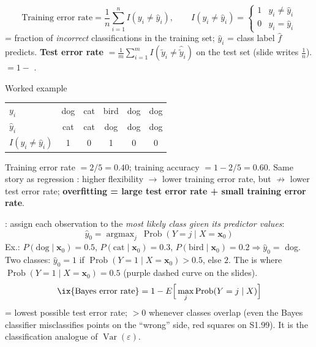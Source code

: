 \begin{keybox}
\[ \text{Training error rate}=\frac1n\sum_{i=1}^n I(y_i\neq\hat y_i),\qquad I(y_i\neq\hat y_i)=\begin{cases}1 & y_i\neq\hat y_i\\0 & y_i=\hat y_i\end{cases} \]
= fraction of \emph{incorrect} classifications in the training set; $\hat y_i$ = class label $\hat f$ predicts. \textbf{Test error rate} $=\frac1m\sum_{i=1}^m I(\tilde y_i\neq\hat{\tilde y}_i)$ on the test set (slide writes $\frac1n$).  $=1-$ .
\end{keybox}

\begin{topic}{Worked example }
\begin{tabular}{@{}lccccc@{}}
$y_i$ & dog & cat & bird & dog & dog\\
$\hat y_i$ & cat & cat & dog & dog & dog\\
$I(y_i\neq\hat y_i)$ & 1 & 0 & 1 & 0 & 0
\end{tabular}

Training error rate $=2/5=0.40$; training accuracy $=1-2/5=0.60$. Same story as regression : higher flexibility $\to$ lower training error rate, but $\not\to$ lower test error rate; \textbf{overfitting = large test error rate + small training error rate}.
\end{topic}

\begin{keybox}
\textbf{}: assign each observation to the \emph{most likely class given its predictor values}:
\[ \hat y_0=\operatorname{argmax}_j\ \operatorname{Prob}(Y=j\mid X=\mathbf x_0) \]
Ex.: $P(\text{dog}\mid\mathbf x_0)=0.5$, $P(\text{cat}\mid\mathbf x_0)=0.3$, $P(\text{bird}\mid\mathbf x_0)=0.2\Rightarrow\hat y_0=$ dog.
Two classes: $\hat y_0=1$ if $\operatorname{Prob}(Y=1\mid X=\mathbf x_0)>0.5$, else $2$. The  is where $\operatorname{Prob}(Y=1\mid X=\mathbf x_0)=0.5$ (purple dashed curve on the slides).
\[ \text{\ix{Bayes error rate}}=1-E\Big[\max_j\operatorname{Prob}(Y=j\mid X)\Big] \]
= lowest possible test error rate; $>0$ whenever classes overlap (even the Bayes classifier misclassifies points on the ``wrong'' side, red squares on S1.99). It is the classification analogue of $\operatorname{Var}(\varepsilon)$.
\end{keybox}

